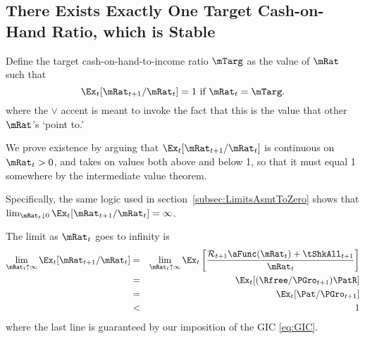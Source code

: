 \documentclass[titlepage]{\econtex}\providecommand{\texname}{BufferStockTheory}%
\begin{document}
{\hypertarget{onetarget}{}
\subsection{There Exists Exactly One Target Cash-on-Hand Ratio,
which is Stable}

\label{subsec:onetarget}

Define the target cash-on-hand-to-income ratio $\mTarg$ as the value of $\mRat$
such that
\begin{equation}  \label{eq:mTarget}
\Ex_t [{\mRat}_{t+1}/\mRat_t] = 1 \mbox{~if~} \mRat_t = \mTarg.
\end{equation}
where the $\vee$ accent is meant to invoke the fact that this is the value that other $\mRat$'s `point to.'

We prove existence by arguing that $\Ex_t [{\mRat}_{t+1}/\mRat_t]$ is
continuous on $\mRat_{t}>0$, %
and takes on values both above and below 1,
so that it must equal 1 somewhere by the intermediate
value theorem.

Specifically, the same logic used in section~\ref{subsec:LimitsAsmtToZero} shows
that $\lim_{\mRat_t \downarrow 0} \Ex_t [{\mRat}_{t+1}/\mRat_t] =
\infty$.

The limit as $\mRat_{t}$ goes to infinity is
\begin{eqnarray*}
  \lim_{\mRat_{t} \uparrow \infty} \Ex_{t}[{\mRat}_{t+1}/\mRat_{t}] & = &   \lim_{\mRat_{t} \uparrow \infty} \Ex_{t}\left[\frac{{\mathcal{\mathcal{R}}}_{t+1}\aFunc(\mRat_{t})+{\tShkAll}_{t+1}}{\mRat_{t}}\right]
\\ & = & \Ex_{t}[(\Rfree/{\PGro}_{t+1})\PatR]
\\ & = & \Ex_{t}[{\Pat}/{\PGro}_{t+1}]
\\ & < & 1
\end{eqnarray*}
where the last line is guaranteed by our imposition of the GIC \eqref{eq:GIC}.

}
\end{document}
